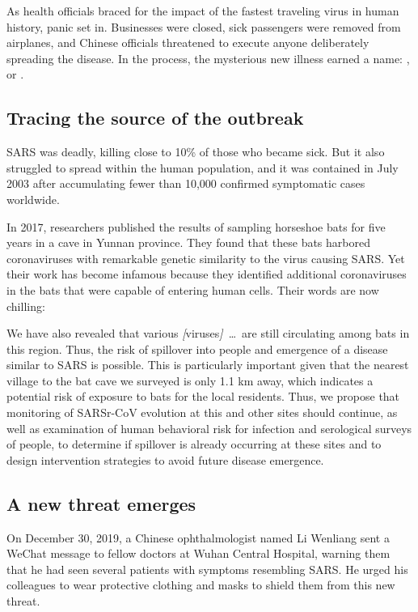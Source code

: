 As health officials braced for the impact of the fastest traveling virus in human history, panic set in. Businesses were closed, sick passengers were removed from airplanes, and Chinese officials threatened to execute anyone deliberately spreading the disease. In the process, the mysterious new illness earned a name: , or .

\FloatBarrier
{}
\subsection{Tracing the source of the outbreak}

SARS was deadly, killing close to 10\% of those who became sick. But it also struggled to spread within the human population, and it was contained in July 2003 after accumulating fewer than 10,000 confirmed symptomatic cases worldwide.

In 2017, researchers published the results of sampling horseshoe bats for five years in a cave in Yunnan province. They found that these bats harbored coronaviruses with remarkable genetic similarity to the virus causing SARS. Yet their work has become infamous because they identified additional coronaviruses in the bats that were capable of entering human cells. Their words are now chilling:

\begin{itquote}
We have also revealed that various \emph{[}viruses\emph{]}~\ldots~are still circulating among bats in this region. Thus, the risk of spillover into people and emergence of a disease similar to SARS is possible. This is particularly important given that the nearest village to the bat cave we surveyed is only 1.1 km away, which indicates a potential risk of exposure to bats for the local residents. Thus, we propose that monitoring of SARSr-CoV evolution at this and other sites should continue, as well as examination of human behavioral risk for infection and serological surveys of people, to determine if spillover is already occurring at these sites and to design intervention strategies to avoid future disease emergence.
\end{itquote}

\FloatBarrier
{}
\subsection{A new threat emerges}

On December 30, 2019, a Chinese ophthalmologist named Li Wenliang sent a WeChat message to fellow doctors at Wuhan Central Hospital, warning them that he had seen several patients with symptoms resembling SARS. He urged his colleagues to wear protective clothing and masks to shield them from this new threat.

